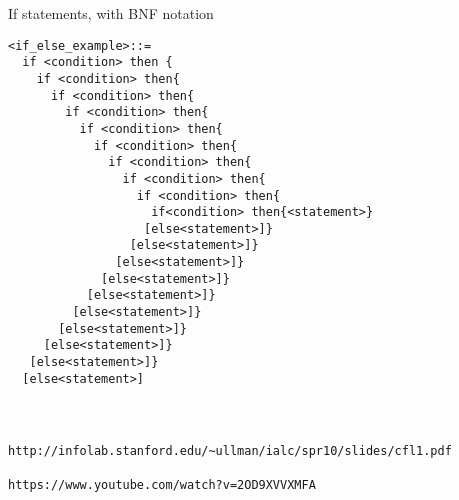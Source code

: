 \documentclass[a4paper,12pt]{letter}%
\begin{document}
\begin{letter}%
{If statements, with BNF notation\\
}
\opening{}



\lstset{breaklines=true, basicstyle=\footnotesize}
\begin{lstlisting}[frame=single]
<if_else_example>::=   
  if <condition> then {
    if <condition> then{
      if <condition> then{
        if <condition> then{
          if <condition> then{
            if <condition> then{
              if <condition> then{
                if <condition> then{
                  if <condition> then{
                    if<condition> then{<statement>}
                   [else<statement>]}
                 [else<statement>]}
               [else<statement>]}
             [else<statement>]}
           [else<statement>]}
         [else<statement>]}
       [else<statement>]}
     [else<statement>]}
   [else<statement>]}
  [else<statement>]
\end{lstlisting}











\begin{lstlisting}

\end{lstlisting}
\begin{lstlisting}

\end{lstlisting}
\begin{lstlisting}

\end{lstlisting}


\closing{   } \vspace{5mm}%


\begin{lstlisting}
http://infolab.stanford.edu/~ullman/ialc/spr10/slides/cfl1.pdf

https://www.youtube.com/watch?v=2OD9XVVXMFA
\end{lstlisting}

\end{letter}
\end{document}
